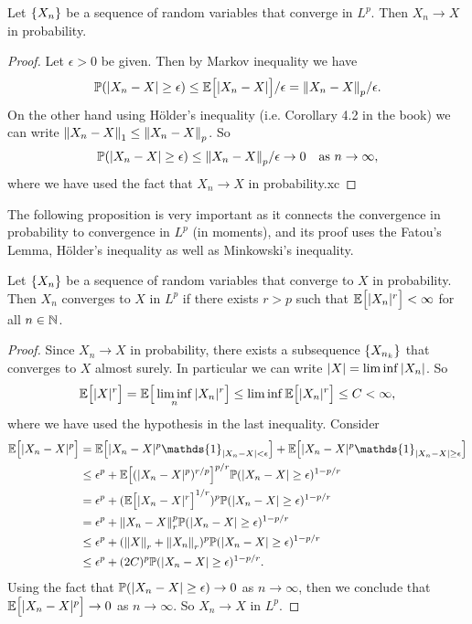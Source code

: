 \begin{theorem}
	Let $ \{X_n\} $ be a sequence of random variables that converge in $ L^p $. Then $ X_n \to X $ in probability.
\end{theorem}
\begin{proof}
	Let $ \epsilon>0 $ be given. Then by Markov inequality we have
	\[ \mathbb{P}(|X_n - X| \geq \epsilon) \leq \mathbb{E}\big[|X_n-X|\big]/\epsilon = \norm{X_n-X}_p/\epsilon. \]
	On the other hand using H\"{o}lder's inequality (i.e. Corollary 4.2 in the book) we can write $ \norm{X_n-X}_1 \leq \norm{X_n-X}_p $. So
	\[ \mathbb{P}(|X_n - X| \geq \epsilon) \leq  \norm{X_n - X}_p/\epsilon \to 0 \quad \text{as $ n\to\infty $}, \]
	where we have used the fact that $ X_n \to X $ in probability.xc
	
\end{proof}


The following proposition is very important as it connects the convergence in probability to convergence in $ L^p $ (in moments), and its proof uses the Fatou's Lemma, H\"{o}lder's inequality as well as Minkowski's inequality.

\begin{proposition}
	Let $ \{X_n\} $ be a sequence of random variables that converge to $ X $ in probability. Then $ X_n $ converges to $ X $ in $ L^p $ if there exists $ r>p $ such that $ \mathbb{E}\big[|X_n|^r\big] < \infty $ for all $ n\in \mathbb{N} $.
\end{proposition}
\begin{proof}
	Since $ X_n\to X $ in probability, there exists a subsequence $ \{X_{n_k}\} $ that converges to $ X $ almost surely. In particular we can write $ |X| = \liminf |X_n| $. So
	\[ \mathbb{E}\big[|X|^r\big] = \mathbb{E}\big[\liminf_n |X_n|^r\big] \leq \liminf \mathbb{E}\big[|X_n|^r\big] \leq C < \infty, \]
	where we have used the hypothesis in the last inequality. Consider
	\begin{align*}
		\E{\abs{X_n - X}^p} &= \E{\abs{X_n-X}^p \mathds{1}_{\abs{X_n - X} < \epsilon}} + \E{\abs{X_n - X}^p \mathds{1}_{\abs{X_n-X}\geq \epsilon} } \\
		&\leq \epsilon^p + \E{(\abs{X_n-X}^p)^{r/p}}^{p/r} \prob(\abs{X_n-X} \geq \epsilon)^{1-p/r} \\
		&= \epsilon^p + (\E{\abs{X_n - X}^r}^{1/r})^{p} \prob(\abs{X_n-X}\geq \epsilon)^{1-p/r} \\
		&= \epsilon^p + \norm{X_n-X}_r^p\prob(\abs{X_n-X}\geq\epsilon)^{1-p/r} \\
		&\leq \epsilon^p + (\norm{X}_r + \norm{X_n}_r)^p \prob(\abs{X_n-X}\geq\epsilon)^{1-p/r} \\
		&\leq \epsilon^p + (2C)^{p}\prob(\abs{X_n-X}\geq\epsilon)^{1-p/r}.
	\end{align*}
	Using the fact that $ \mathbb{P}(|X_n-X|\geq \epsilon) \to 0 $ as $ n\to\infty $, then we conclude that $ \mathbb{E}\big[|X_n-X|^p\big] \to 0 $ as $ n\to\infty $. So $ X_n \to X $ in $ L^p $.
\end{proof}